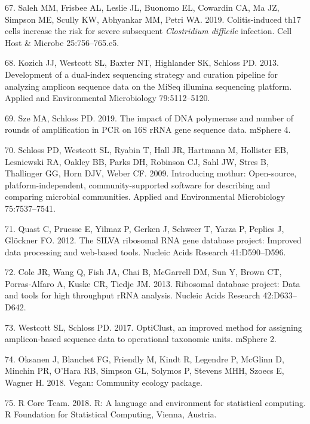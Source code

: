\documentclass[
  11pt,
]{article}
\begin{document}
\leavevmode\hypertarget{ref-Saleh2019}{}%
67. Saleh MM, Frisbee AL, Leslie JL, Buonomo EL, Cowardin CA, Ma JZ,
Simpson ME, Scully KW, Abhyankar MM, Petri WA. 2019. Colitis-induced
th17 cells increase the risk for severe subsequent \emph{Clostridium
difficile} infection. Cell Host \& Microbe 25:756--765.e5.

\leavevmode\hypertarget{ref-Kozich2013}{}%
68. Kozich JJ, Westcott SL, Baxter NT, Highlander SK, Schloss PD. 2013.
Development of a dual-index sequencing strategy and curation pipeline
for analyzing amplicon sequence data on the MiSeq illumina sequencing
platform. Applied and Environmental Microbiology 79:5112--5120.

\leavevmode\hypertarget{ref-Sze2019}{}%
69. Sze MA, Schloss PD. 2019. The impact of DNA polymerase and number of
rounds of amplification in PCR on 16S rRNA gene sequence data. mSphere
4.

\leavevmode\hypertarget{ref-Schloss2009}{}%
70. Schloss PD, Westcott SL, Ryabin T, Hall JR, Hartmann M, Hollister
EB, Lesniewski RA, Oakley BB, Parks DH, Robinson CJ, Sahl JW, Stres B,
Thallinger GG, Horn DJV, Weber CF. 2009. Introducing mothur:
Open-source, platform-independent, community-supported software for
describing and comparing microbial communities. Applied and
Environmental Microbiology 75:7537--7541.

\leavevmode\hypertarget{ref-Quast2012}{}%
71. Quast C, Pruesse E, Yilmaz P, Gerken J, Schweer T, Yarza P, Peplies
J, Glöckner FO. 2012. The SILVA ribosomal RNA gene database project:
Improved data processing and web-based tools. Nucleic Acids Research
41:D590--D596.

\leavevmode\hypertarget{ref-Cole2013}{}%
72. Cole JR, Wang Q, Fish JA, Chai B, McGarrell DM, Sun Y, Brown CT,
Porras-Alfaro A, Kuske CR, Tiedje JM. 2013. Ribosomal database project:
Data and tools for high throughput rRNA analysis. Nucleic Acids Research
42:D633--D642.

\leavevmode\hypertarget{ref-Westcott2017}{}%
73. Westcott SL, Schloss PD. 2017. OptiClust, an improved method for
assigning amplicon-based sequence data to operational taxonomic units.
mSphere 2.

\leavevmode\hypertarget{ref-Vegan2018}{}%
74. Oksanen J, Blanchet FG, Friendly M, Kindt R, Legendre P, McGlinn D,
Minchin PR, O'Hara RB, Simpson GL, Solymos P, Stevens MHH, Szoecs E,
Wagner H. 2018. Vegan: Community ecology package.

\leavevmode\hypertarget{ref-r_citation_2018}{}%
75. R Core Team. 2018. R: A language and environment for statistical
computing. R Foundation for Statistical Computing, Vienna, Austria.
\end{document}
